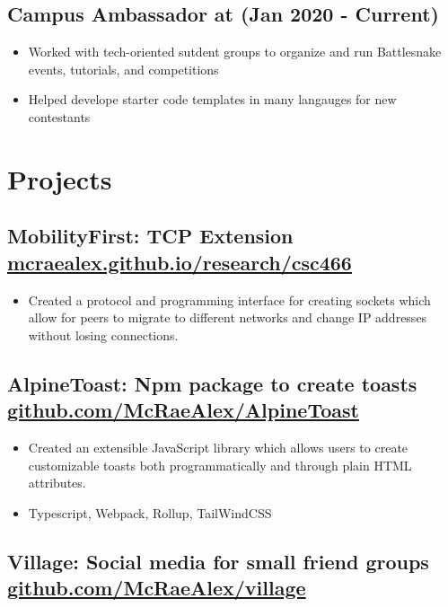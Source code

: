 \documentclass{article}
\newcommand{\hrefColored}[3]{\href{#2}{\color{#1}{#3}}}
\begin{document}
\subsection{Campus Ambassador at \hrefColored{blue}{https://play.battlesnake.com/}{BattleSnake} (Jan 2020 - Current)}

\begin{itemize}
    \item Worked with tech-oriented sutdent groups to organize and run Battlesnake events, tutorials, and competitions
    \item Helped develope starter code templates in many langauges for new contestants
\end{itemize}

\section{Projects}

\subsection{MobilityFirst: TCP Extension \href{https://mcraealex.github.io/research/csc466}{mcraealex.github.io/research/csc466}}

\begin{itemize}
    \item Created a protocol and programming interface for creating sockets which allow for peers to migrate to different networks and change IP addresses without losing connections.
\end{itemize}

\subsection{AlpineToast: Npm package to create toasts \href{https://github.com/McRaeAlex/AlpineToast}{github.com/McRaeAlex/AlpineToast}}

\begin{itemize}
    \item Created an extensible JavaScript library which allows users to create customizable toasts both programmatically and through plain HTML attributes. 
    \item Typescript, Webpack, Rollup, TailWindCSS 
\end{itemize}

\subsection{Village: Social media for small friend groups \href{https://github.com/McRaeAlex/village}{github.com/McRaeAlex/village}}
\end{document}
